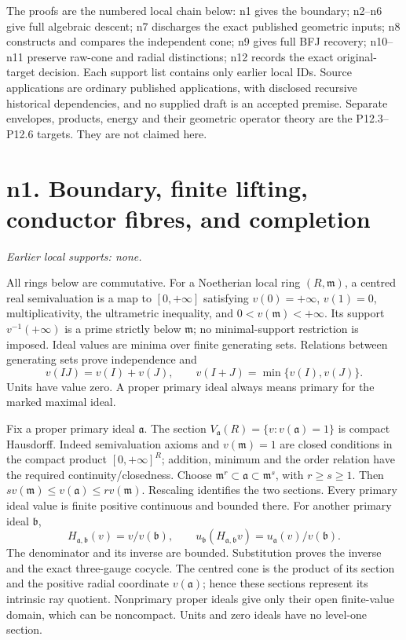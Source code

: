 \documentclass[11pt]{article}
\begin{document}
The proofs are the numbered local chain below: n1 gives the boundary; n2--n6
give full algebraic descent; n7 discharges the exact published geometric inputs;
n8 constructs and compares the independent cone; n9 gives full BFJ recovery;
n10--n11 preserve raw-cone and radial distinctions; n12 records the exact
original-target decision. Each support list contains only earlier local IDs.
Source applications are ordinary published applications, with disclosed
recursive historical dependencies, and no supplied draft is an accepted premise.
Separate envelopes, products, energy and their geometric operator theory are
the P12.3--P12.6 targets. They are not claimed here.
\section{n1. Boundary, finite lifting, conductor fibres, and completion}
\textit{Earlier local supports: none.}

All rings below are commutative. For a Noetherian local ring \((R,\mathfrak m)\), a centred real semivaluation is a map to \([0,+\infty]\) satisfying \(v(0)=+\infty\), \(v(1)=0\), multiplicativity, the ultrametric inequality, and \(0<v(\mathfrak m)<+\infty\). Its support \(v^{-1}(+\infty)\) is a prime strictly below \(\mathfrak m\); no minimal-support restriction is imposed. Ideal values are minima over finite generating sets. Relations between generating sets prove independence and
\[
v(IJ)=v(I)+v(J),\qquad v(I+J)=\min\{v(I),v(J)\}.
\]
Units have value zero. A proper primary ideal always means primary for the marked maximal ideal.

Fix a proper primary ideal \(\mathfrak a\). The section \(V_{\mathfrak a}(R)=\{v:v(\mathfrak a)=1\}\) is compact Hausdorff. Indeed semivaluation axioms and \(v(\mathfrak m)=1\) are closed conditions in the compact product \([0,+\infty]^R\); addition, minimum and the order relation have the required continuity/closedness. Choose \(\mathfrak m^r\subset\mathfrak a\subset\mathfrak m^s\), with \(r\ge s\ge1\). Then \(s v(\mathfrak m)\le v(\mathfrak a)\le r v(\mathfrak m)\). Rescaling identifies the two sections. Every primary ideal value is finite positive continuous and bounded there. For another primary ideal \(\mathfrak b\),
\[
H_{\mathfrak a,\mathfrak b}(v)=v/v(\mathfrak b),\qquad
u_{\mathfrak b}(H_{\mathfrak a,\mathfrak b}v)=u_{\mathfrak a}(v)/v(\mathfrak b).
\]
The denominator and its inverse are bounded. Substitution proves the inverse and the exact three-gauge cocycle. The centred cone is the product of its section and the positive radial coordinate \(v(\mathfrak a)\); hence these sections represent its intrinsic ray quotient. Nonprimary proper ideals give only their open finite-value domain, which can be noncompact. Units and zero ideals have no level-one section.
\end{document}
